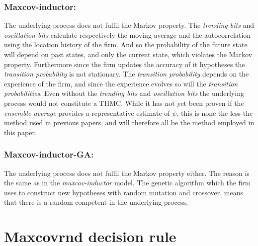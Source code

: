 \documentclass[preprint, 12pt]{elsarticle}
\begin{document}
\subsubsection*{Maxcov-inductor:}
The underlying process does not fulfil the Markov property. The \emph{trending bits} and \emph{oscillation bits} calculate respectively the moving average and the autocorrelation using the location history of the firm. And so the probability of the future state will depend on past states, and only the current state, which violates the Markov property. Furthermore since the firm updates the accuracy of it hypotheses the \emph{transition probability} is not stationary. The \emph{transition probability} depends on the experience of the firm, and since the experience evolves so will the \emph{transition probabilities}. Even without the \emph{trending bits} and \emph{oscillation bits} the underlying process would not constitute a THMC. While it has not yet been proven if the \emph{ensemble average} provides a representative estimate of $\psi$, this is none the less the method used in previous papers, and will therefore all be the method employed in this paper.

\subsubsection*{Maxcov-inductor-GA:}
The underlying process does not fulfil the Markov property either. The reason is the same as in the \emph{maxcov-inductor} model. The genetic algorithm which the firm uses to construct new hypotheses with random mutation and crossover, means that there is a random competent in the underlying process.

\section{Maxcovrnd decision rule}
\label{app:maxcovrnd}
\end{document}
